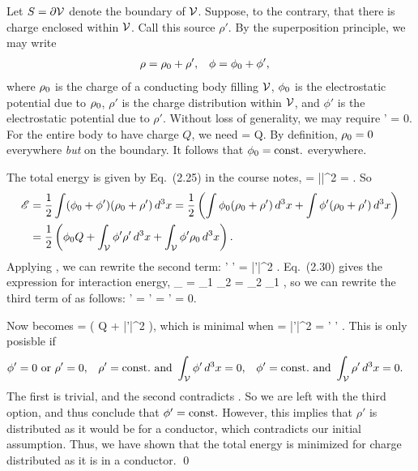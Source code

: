 \begin{solution}
	Let $S = \partial \mathcal{V}$ denote the boundary of $\mathcal{V}$.  Suppose, to the contrary, that there is charge enclosed within $\mathcal{V}$.  Call this source $\rho'$.  By the superposition principle, we may write
	\begin{align*}
		\rho &= \rho_0 + \rho', &
		\phi &= \phi_0 + \phi',
	\end{align*}
	where $\rho_0$ is the charge of a conducting body filling $\mathcal{V}$, $\phi_0$ is the electrostatic potential due to $\rho_0$, $\rho'$ is the charge distribution within $\mathcal{V}$, and $\phi'$ is the electrostatic potential due to $\rho'$.  Without loss of generality, we may require
	\beqn \label{wtf}
		\intV \rho' \dcx = 0.
	\eeqn
	For the entire body to have charge $Q$, we need
	\beq
		\int \rhoo \dcx = Q.
	\eeq
	By definition, $\rho_0 = 0$ everywhere \emph{but} on the boundary.  It follows that $\phi_0 = \text{const.}$ everywhere.

	The total energy is given by Eq.~(2.25) in the course notes,
	\beqn \label{tote}
		\sE =  \intV |\vE|^2 \dcx =  \int \phi \rho \dcx.
	\eeqn
	So
	\begin{align}
		\mathscr{E} &= \frac{1}{2} \int (\phi_0 + \phi') (\rho_0 + \rho') \dd[3]{x}
		= \frac{1}{2} \left( \int \phi_0 (\rho_0 + \rho') \dd[3]{x} + \int \phi' (\rho_0 + \rho') \dd[3]{x} \right) \notag \\
		&= \frac{1}{2} \left( \phi_0 Q + \int_{\mathcal{V}} \phi' \rho' \dd[3]{x} + \int_{\mathcal{V}} \phi' \rho_0 \dd[3]{x} \right). \label{3terms}
	\end{align}
	Applying , we can rewrite the second term:
	\beq
		\intV \phi' \rho' \dcx =  \intV |\vE'|^2 \dcx {}.
	\eeq
	Eq.~(2.30) gives the expression for interaction energy,
	\beq
		\sE_ = \int \rho_1 \phi_2 \dcx = \int \rho_2 \phi_1 \dcx,
	\eeq
	so we can rewrite the third term of  as follows:
	\beq
		\intV \phi' \rhoo \dcx = \intV \phio \rho' \dcx = \phio \intV \rho' \dcx = 0.
	\eeq
	
	Now  becomes
	\beq
		\sE =  \left( \phio Q +  \intV |\vE'|^2 \dcx \right),
	\eeq
	which is minimal when
	 =  \intV |\vE'|^2 \dcx = \intV \phi' \rho' \dcx.
	\eeq
	This is only posisble if
	\begin{align*}
		\phi' = 0 &\text{ or } \rho' = 0, &
		\rho' = \text{const.} &\text{ and } \int_{\mathcal{V}} \phi' \dd[3]{x} = 0, &
		\phi' = \text{const.} &\text{ and } \int_{\mathcal{V}} \rho' \dd[3]{x} = 0.
	\end{align*}
	The first is trivial, and the second contradicts .  So we are left with the third option, and thus conclude that $\phi' = \text{const.}$  However, this implies that $\rho'$ is distributed as it would be for a conductor, which contradicts our initial assumption.  Thus, we have shown that the total energy is minimized for charge distributed as it is in a conductor. \qed
\end{solution}
